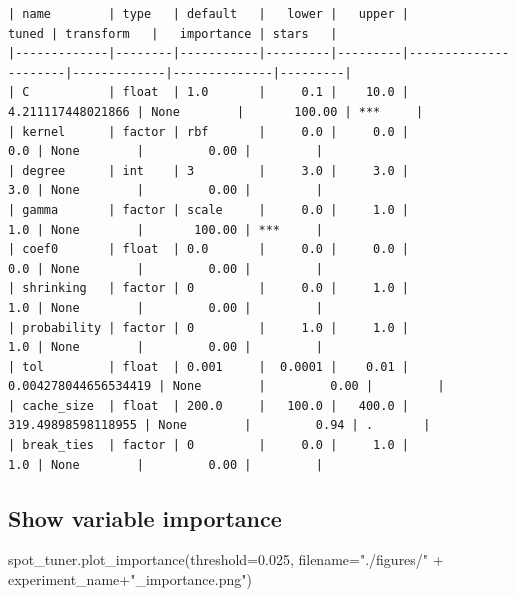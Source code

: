\documentclass[
  letterpaper,
  DIV=11,
  numbers=noendperiod]{scrreprt}
\newenvironment{Shaded}{\begin{snugshade}}{\end{snugshade}}
\newcommand{\FloatTok}[1]{\textcolor[rgb]{0.68,0.00,0.00}{#1}}
\newcommand{\NormalTok}[1]{\textcolor[rgb]{0.00,0.23,0.31}{#1}}
\newcommand{\OperatorTok}[1]{\textcolor[rgb]{0.37,0.37,0.37}{#1}}
\newcommand{\StringTok}[1]{\textcolor[rgb]{0.13,0.47,0.30}{#1}}
\begin{document}
\begin{verbatim}
| name        | type   | default   |   lower |   upper |                tuned | transform   |   importance | stars   |
|-------------|--------|-----------|---------|---------|----------------------|-------------|--------------|---------|
| C           | float  | 1.0       |     0.1 |    10.0 |    4.211117448021866 | None        |       100.00 | ***     |
| kernel      | factor | rbf       |     0.0 |     0.0 |                  0.0 | None        |         0.00 |         |
| degree      | int    | 3         |     3.0 |     3.0 |                  3.0 | None        |         0.00 |         |
| gamma       | factor | scale     |     0.0 |     1.0 |                  1.0 | None        |       100.00 | ***     |
| coef0       | float  | 0.0       |     0.0 |     0.0 |                  0.0 | None        |         0.00 |         |
| shrinking   | factor | 0         |     0.0 |     1.0 |                  1.0 | None        |         0.00 |         |
| probability | factor | 0         |     1.0 |     1.0 |                  1.0 | None        |         0.00 |         |
| tol         | float  | 0.001     |  0.0001 |    0.01 | 0.004278044656534419 | None        |         0.00 |         |
| cache_size  | float  | 200.0     |   100.0 |   400.0 |   319.49898598118955 | None        |         0.94 | .       |
| break_ties  | factor | 0         |     0.0 |     1.0 |                  1.0 | None        |         0.00 |         |
\end{verbatim}

\hypertarget{show-variable-importance-3}{%
\subsection{Show variable importance}\label{show-variable-importance-3}}

\begin{Shaded}
\begin{Highlighting}[]
\NormalTok{spot\_tuner.plot\_importance(threshold}\OperatorTok{=}\FloatTok{0.025}\NormalTok{, filename}\OperatorTok{=}\StringTok{"./figures/"} \OperatorTok{+}\NormalTok{ experiment\_name}\OperatorTok{+}\StringTok{"\_importance.png"}\NormalTok{)}
\end{Highlighting}
\end{Shaded}
\end{document}
